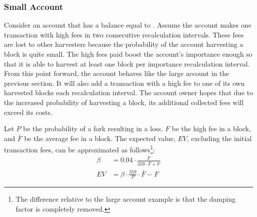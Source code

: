 \subsubsection*{Small Account}

Consider an account that has a balance equal to .
Assume the account makes one transaction with high fees in two consecutive recalculation intervals.
These fees are lost to other harvesters because the probability of the account harvesting a block is quite small.
The high fees paid boost the account’s importance enough so that it is able to harvest at least one block per importance recalculation interval.
From this point forward, the account behaves like the large account in the previous section.
It will also add a transaction with a high fee to one of its own harvested blocks each recalculation interval.
The account owner hopes that due to the increased probability of harvesting a block, its additional collected fees will exceed its costs.

\begin{figure}[H]
\end{figure}

Let $P$ be the probability of a fork resulting in a loss, $F$ be the high fee in a block, and $\bar{F}$ be the average fee in a block.
The expected value, $EV$, excluding the initial transaction fees, can be approximated as follows\footnote{
The difference relative to the large account example is that the damping factor is completely removed.}:
\begin{align*}
	\tag{importance boost}\beta &= 0.04 \cdot \frac{F}{359 \cdot \bar{F} + F} \\
	\tag{expected value} EV &= \beta \cdot \frac{359}{P} \cdot \bar{F} - F
\end{align*}

